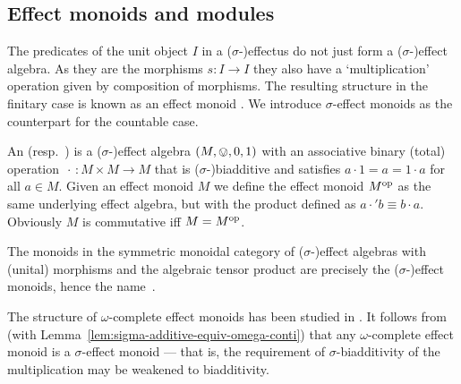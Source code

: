 \documentclass[%
	submission,
copyright,creativecommons,UKenglish]{eptcs}
\begin{document}
\subsection{Effect monoids and modules}
The predicates of the unit object $I$ in a ($\sigma$-)effectus do not just form a ($\sigma$-)effect algebra. As they are the morphisms $s:I\rightarrow I$ they also have a `multiplication' operation given by composition of morphisms.
The resulting structure in the finitary case is known as an effect monoid
\cite{Jacobs2011,jacobs2015new}.
We introduce $\sigma$-effect monoids as the counterpart for the countable case.

\begin{definition}\label{def:effectmonoid}
    An  (resp.~)
    is a ($\sigma$-)effect algebra
    $(M,\ovee, 0, 1)$
    with an associative binary (total) operation
    $\,\cdot\,\colon M\times M\to M$
    that is ($\sigma$-)biadditive
    and satisfies $a\cdot 1 = a = 1\cdot a$
    for all $a\in M$.
Given an effect monoid $M$ we define the  effect
monoid $M^{\mathrm{op}}$ as the same underlying effect algebra, but with the
product defined as $a\cdot'b \equiv b\cdot a$. Obviously $M$ is commutative
iff $M=M^{\mathrm{op}}$.
\end{definition}
The monoids
in the symmetric monoidal category of ($\sigma$-)effect algebras with (unital) morphisms
and the
algebraic tensor product
are precisely the ($\sigma$-)effect monoids, hence the name~\cite{jacobs2012coreflections,Gudder1998}. 

The structure of $\omega$-complete effect monoids
has been studied in \cite{effectmonoids}.
It follows
from \cite[Theorem 43]{effectmonoids}
(with Lemma~\ref{lem:sigma-additive-equiv-omega-conti}) that
any $\omega$-complete effect monoid
is a $\sigma$-effect monoid
--- that is, the requirement of $\sigma$-biadditivity
of the multiplication may be weakened to biadditivity.
\end{document}
